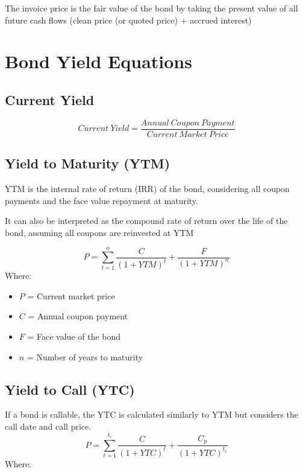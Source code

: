 \documentclass[
]{book}
\providecommand{\tightlist}{%
  \setlength{\itemsep}{0pt}\setlength{\parskip}{0pt}}
\begin{document}
The invoice price is the fair value of the bond by taking the present value of all future cash flows (clean price (or quoted price) + accrued interest)

\hypertarget{bond-yield-equations}{%
\section{Bond Yield Equations}\label{bond-yield-equations}}

\hypertarget{current-yield}{%
\subsection{Current Yield}\label{current-yield}}

\[
Current\ Yield = \frac{Annual\ Coupon\ Payment}{Current\ Market\ Price}
\]

\hypertarget{yield-to-maturity-ytm}{%
\subsection{Yield to Maturity (YTM)}\label{yield-to-maturity-ytm}}

YTM is the internal rate of return (IRR) of the bond, considering all coupon payments and the face value repayment at maturity.

It can also be interpreted as the compound rate of return over the life of the bond, assuming all coupons are reinvested at YTM

\[
P = \sum_{t=1}^{n} \frac{C}{(1+YTM)^t} + \frac{F}{(1+YTM)^n}
\]
Where:

\begin{itemize}
\tightlist
\item
  \(P\) = Current market price
\item
  \(C\) = Annual coupon payment
\item
  \(F\) = Face value of the bond
\item
  \(n\) = Number of years to maturity
\end{itemize}

\hypertarget{yield-to-call-ytc}{%
\subsection{Yield to Call (YTC)}\label{yield-to-call-ytc}}

If a bond is callable, the YTC is calculated similarly to YTM but considers the call date and call price.
\[
P = \sum_{t=1}^{t_c} \frac{C}{(1+YTC)^t} + \frac{C_p}{(1+YTC)^{t_c}}
\]
Where:
\end{document}
